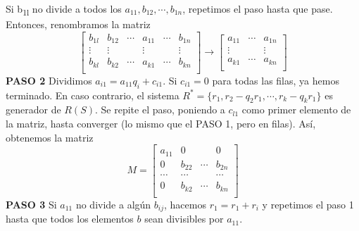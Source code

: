 \documentclass[a4paper, 11pt]{extarticle}
\begin{document}
Si b\textsubscript{1l} no divide a todos los \(a_{11}, b_{12}, \cdots, b_{1n}\), repetimos el
paso hasta que pase. Entonces, renombramos la matriz
\[   \begin{bmatrix}
b_{1l} &  b_{12} &  \cdots  &  a_{11} &  \cdots  &  b_{1n} \\ 
\vdots &  \vdots &   &  \vdots&   &  \vdots \\ 
b_{kl} &  b_{k2} &  \cdots  &  a_{k1} &  \cdots  &  b_{kn} \\ 
\end{bmatrix}   \rightarrow \begin{bmatrix}
a_{11} &  \cdots  &  a_{1n} \\ 
\vdots
&   &  \vdots \\
a_{k1} & \cdots &  a_{kn} \\ 
\end{bmatrix}
\]
\textbf{PASO 2} Dividimos \(a_{i1} = a_{11}q_{i} + c_{i1}\). Si \(c_{i1} = 0\) para
todas las filas, ya hemos terminado. En caso contrario, el sistema \(R^* =
\{r_1, r_2 - q_2r_1, \cdots, r_k - q_kr_1\}\) es generador de \(R(S)\). Se repite
el paso, poniendo a \(c_{l1}\) como primer elemento de la matriz, hasta
converger (lo mismo que el PASO 1, pero en filas). Así, obtenemos la matriz
\[ M =  \begin{bmatrix}
a_{11} &  0 &   &  0 \\ 
0 &  b_{22} &  \cdots  &  b_{2n} \\ 
\cdots &  \cdots  &   &  \cdots  \\ 
0 &  b_{k2} &  \cdots  &  b_{kn} \\ 
\end{bmatrix}  \]
\textbf{PASO 3} Si \(a_{11}\) no divide a algún \(b_{ij}\), hacemos \(r_1 = r_1 + r_i\)
 y repetimos el paso 1 hasta que todos los elementos \(b\) sean divisibles por
\(a_{11}\).
\end{document}
